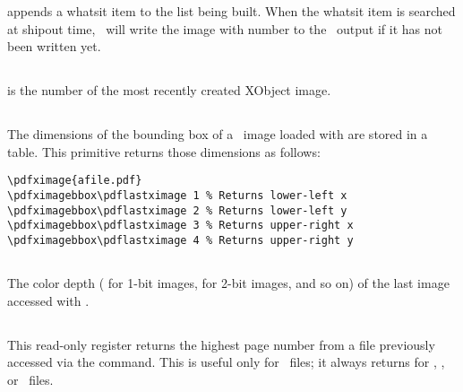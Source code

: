 \documentclass{pdftexmanual}
\begin{document}
 appends a whatsit item to the list being built. When
the whatsit item is searched at shipout time, \PDFTEX\ will write the image
with number  to the \PDF\ output if it has not been
written yet.

\subsection{}

\type{\pdflastximage} is the number of the most recently created XObject
image.

\subsection{}

The dimensions of the bounding box of a \PDF\ image loaded with
 are stored in a table. This primitive returns those
dimensions as follows:

\begin{verbatim}
\pdfximage{afile.pdf}
\pdfximagebbox\pdflastximage 1 % Returns lower-left x
\pdfximagebbox\pdflastximage 2 % Returns lower-left y
\pdfximagebbox\pdflastximage 3 % Returns upper-right x
\pdfximagebbox\pdflastximage 4 % Returns upper-right y
\end{verbatim}

\subsection{}

The color depth ( for 1-bit images,  for 2-bit images,
and so on) of the last image accessed with .

\subsection{}

This read-only register returns the highest page number from a file
previously accessed via the  command.
This is useful only for \PDF\ files; it always returns 
for \PNG, \JPEG, or \JBIGTWO\ files.
\end{document}
